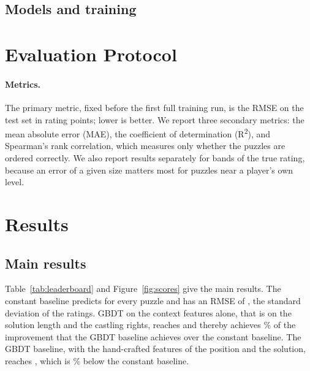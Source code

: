 \documentclass[11pt]{article}
\begin{document}
\subsection{Models and training}
\label{sec:models}



\section{Evaluation Protocol}
\label{sec:protocol}

\paragraph{Metrics.}
The primary metric, fixed before the first full training run, is the RMSE on
the test set in rating points; lower is better. We report three secondary
metrics: the mean absolute error (MAE), the coefficient of determination
(R\textsuperscript{2}), and Spearman's rank correlation, which measures only whether the
puzzles are ordered correctly. We also report results separately for
 bands of the true rating, because an error of a given size
matters most for puzzles near a player's own level.



\section{Results}
\label{sec:results}

\subsection{Main results}

Table~\ref{tab:leaderboard} and Figure~\ref{fig:scores} give the main
results. The constant baseline predicts  for every puzzle
and has an RMSE of , the standard deviation of the ratings.
GBDT on the context features alone, that is on the solution length and the
castling rights, reaches  and thereby achieves
\% of the improvement that the GBDT baseline achieves
over the constant baseline. The GBDT baseline, with the hand-crafted features
of the position and the solution, reaches , which is
\% below the constant baseline.

\begin{table}[htbp]\centering\small
{}
\caption{Main results on the  test puzzles, best first.
The gain is the paired difference from  on the same
resampled games. It is positive when the model is better, and bold when
statistically significant.}
\label{tab:leaderboard}
\end{table}
\end{document}
